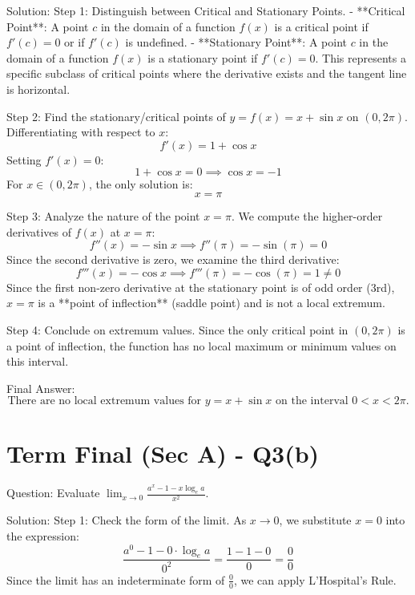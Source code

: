 \documentclass{article}
\begin{document}
Solution:
Step 1: Distinguish between Critical and Stationary Points.
- **Critical Point**: A point $c$ in the domain of a function $f(x)$ is a critical point if $f'(c) = 0$ or if $f'(c)$ is undefined.
- **Stationary Point**: A point $c$ in the domain of a function $f(x)$ is a stationary point if $f'(c) = 0$. This represents a specific subclass of critical points where the derivative exists and the tangent line is horizontal.

Step 2: Find the stationary/critical points of $y = f(x) = x + \sin x$ on $(0, 2\pi)$.
Differentiating with respect to $x$:
\[
f'(x) = 1 + \cos x
\]
Setting $f'(x) = 0$:
\[
1 + \cos x = 0 \implies \cos x = -1
\]
For $x \in (0, 2\pi)$, the only solution is:
\[
x = \pi
\]

Step 3: Analyze the nature of the point $x = \pi$.
We compute the higher-order derivatives of $f(x)$ at $x = \pi$:
\[
f''(x) = -\sin x \implies f''(\pi) = -\sin(\pi) = 0
\]
Since the second derivative is zero, we examine the third derivative:
\[
f'''(x) = -\cos x \implies f'''(\pi) = -\cos(\pi) = 1 \ne 0
\]
Since the first non-zero derivative at the stationary point is of odd order (3rd), $x = \pi$ is a **point of inflection** (saddle point) and is not a local extremum.

Step 4: Conclude on extremum values.
Since the only critical point in $(0, 2\pi)$ is a point of inflection, the function has no local maximum or minimum values on this interval.

Final Answer:
\[
\boxed{\text{There are no local extremum values for } y = x + \sin x \text{ on the interval } 0 < x < 2\pi.}
\]

\section*{Term Final (Sec A) - Q3(b)}
Question:
Evaluate $\lim_{x \to 0} \frac{a^x - 1 - x \log_e a}{x^2}$.

Solution:
Step 1: Check the form of the limit.
As $x \to 0$, we substitute $x = 0$ into the expression:
\[
\frac{a^0 - 1 - 0 \cdot \log_e a}{0^2} = \frac{1 - 1 - 0}{0} = \frac{0}{0}
\]
Since the limit has an indeterminate form of $\frac{0}{0}$, we can apply L'Hospital's Rule.
\end{document}
